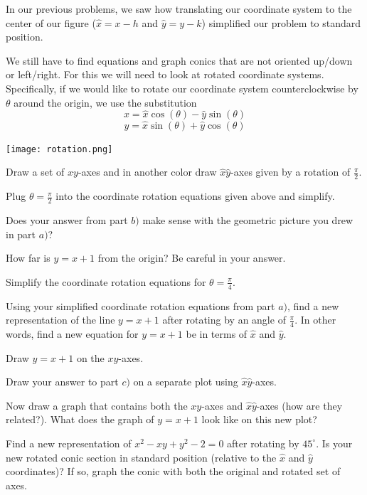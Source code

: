 \begin{info} In our previous problems, we saw how translating our coordinate system to the center of our figure ($\hat{x}=x-h$ and $\hat{y}=y-k$) simplified our problem to standard position.

We still have to find equations and graph conics that are not oriented up/down or left/right. For this we will need to look at rotated coordinate systems. Specifically, if we would like to rotate our coordinate system counterclockwise by $\theta$ around the origin, we use the substitution $$x=\hat{x} \cos(\theta) - \hat{y} \sin(\theta) $$ $$y=\hat{x} \sin(\theta) + \hat{y} \cos(\theta)$$

\begin{center} \texttt{[image: rotation.png]} \end{center}
\end{info}
\bq \be
\item Draw a set of $xy$-axes and in another color draw $\hat{x}\hat{y}$-axes given by a rotation of $\frac{\pi}{2}$.
\item Plug $\theta = \frac{\pi}{2}$ into the coordinate rotation equations given above and simplify.
\item Does your answer from part $b)$ make sense with the geometric picture you drew in part $a)$?
\ee \eq

\bq
\be
\item How far is $y=x+1$ from the origin? Be careful in your answer.
\item Simplify the coordinate rotation equations for $\theta =\frac{\pi}{4}$.
\item Using your simplified coordinate rotation equations from part $a)$, find a new representation of the line $y=x+1$ after rotating by an angle of $\frac{\pi}{4}$. In other words, find a new equation for $y=x+1$ be in terms of $\hat{x}$ and $\hat{y}$.
\item Draw $y=x+1$ on the $xy$-axes.
\item Draw your answer to part $c)$ on a separate plot using $\hat{x}\hat{y}$-axes.
\item Now draw a graph that contains both the $xy$-axes and $\hat{x}\hat{y}$-axes (how are they related?). What does the graph of $y=x+1$ look like on this new plot?
\ee
\eq

\question Find a new representation of $x^2-xy+y^2-2=0$ after rotating by $45^{\circ}$. Is your new rotated conic section in standard position (relative to the $\widehat{x}$ and $\widehat{y}$ coordinates)? If so, graph the conic with both the original and rotated set of axes.

